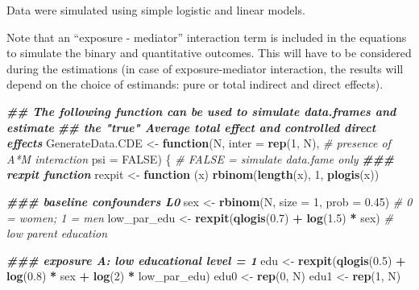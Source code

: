 \documentclass[
]{book}
\newenvironment{Shaded}{\begin{snugshade}}{\end{snugshade}}
\newcommand{\AttributeTok}[1]{\textcolor[rgb]{0.13,0.29,0.53}{#1}}
\newcommand{\CommentTok}[1]{\textcolor[rgb]{0.56,0.35,0.01}{\textit{#1}}}
\newcommand{\ConstantTok}[1]{\textcolor[rgb]{0.56,0.35,0.01}{#1}}
\newcommand{\ControlFlowTok}[1]{\textcolor[rgb]{0.13,0.29,0.53}{\textbf{#1}}}
\newcommand{\DecValTok}[1]{\textcolor[rgb]{0.00,0.00,0.81}{#1}}
\newcommand{\DocumentationTok}[1]{\textcolor[rgb]{0.56,0.35,0.01}{\textbf{\textit{#1}}}}
\newcommand{\FloatTok}[1]{\textcolor[rgb]{0.00,0.00,0.81}{#1}}
\newcommand{\FunctionTok}[1]{\textcolor[rgb]{0.13,0.29,0.53}{\textbf{#1}}}
\newcommand{\NormalTok}[1]{#1}
\newcommand{\OtherTok}[1]{\textcolor[rgb]{0.56,0.35,0.01}{#1}}
\newcommand{\SpecialCharTok}[1]{\textcolor[rgb]{0.81,0.36,0.00}{\textbf{#1}}}
\begin{document}
Data were simulated using simple logistic and linear models.

Note that an ``exposure - mediator'' interaction term is included in the equations to simulate the binary and quantitative outcomes. This will have to be considered during the estimations (in case of exposure-mediator interaction, the results will depend on the choice of estimands: pure or total indirect and direct effects).

\begin{Shaded}
\begin{Highlighting}[]
\DocumentationTok{\#\# The following function can be used to simulate data.frames and estimate}
\DocumentationTok{\#\# the "true" Average total effect and controlled direct effects}
\NormalTok{GenerateData.CDE }\OtherTok{\textless{}{-}} \ControlFlowTok{function}\NormalTok{(N, }
                             \AttributeTok{inter =} \FunctionTok{rep}\NormalTok{(}\DecValTok{1}\NormalTok{, N), }\CommentTok{\# presence of A*M interaction}
                             \AttributeTok{psi =} \ConstantTok{FALSE}\NormalTok{) \{ }\CommentTok{\# FALSE = simulate data.fame only}
  \DocumentationTok{\#\#\# rexpit function}
\NormalTok{  rexpit }\OtherTok{\textless{}{-}} \ControlFlowTok{function}\NormalTok{ (x) }\FunctionTok{rbinom}\NormalTok{(}\FunctionTok{length}\NormalTok{(x), }\DecValTok{1}\NormalTok{, }\FunctionTok{plogis}\NormalTok{(x))}
  
  \DocumentationTok{\#\#\# baseline confounders L0}
\NormalTok{  sex }\OtherTok{\textless{}{-}} \FunctionTok{rbinom}\NormalTok{(N, }\AttributeTok{size =} \DecValTok{1}\NormalTok{, }\AttributeTok{prob =} \FloatTok{0.45}\NormalTok{) }\CommentTok{\# 0 = women; 1 = men}
\NormalTok{  low\_par\_edu }\OtherTok{\textless{}{-}} \FunctionTok{rexpit}\NormalTok{(}\FunctionTok{qlogis}\NormalTok{(}\FloatTok{0.7}\NormalTok{) }\SpecialCharTok{+} \FunctionTok{log}\NormalTok{(}\FloatTok{1.5}\NormalTok{) }\SpecialCharTok{*}\NormalTok{ sex) }\CommentTok{\# low parent education}
  
  \DocumentationTok{\#\#\# exposure A: low educational level = 1}
\NormalTok{  edu }\OtherTok{\textless{}{-}} \FunctionTok{rexpit}\NormalTok{(}\FunctionTok{qlogis}\NormalTok{(}\FloatTok{0.5}\NormalTok{) }\SpecialCharTok{+} \FunctionTok{log}\NormalTok{(}\FloatTok{0.8}\NormalTok{) }\SpecialCharTok{*}\NormalTok{ sex  }\SpecialCharTok{+} \FunctionTok{log}\NormalTok{(}\DecValTok{2}\NormalTok{) }\SpecialCharTok{*}\NormalTok{ low\_par\_edu)}
\NormalTok{  edu0 }\OtherTok{\textless{}{-}} \FunctionTok{rep}\NormalTok{(}\DecValTok{0}\NormalTok{, N)}
\NormalTok{  edu1 }\OtherTok{\textless{}{-}} \FunctionTok{rep}\NormalTok{(}\DecValTok{1}\NormalTok{, N)}
  

\end{Highlighting}
\end{Shaded}
\end{document}
